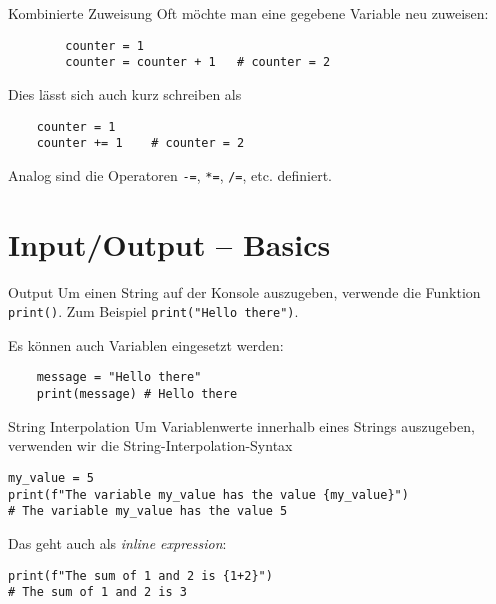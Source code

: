 \documentclass[algorithm,pgfplots,colortheme=dark]{cuzbeamer}
\newcommand{\py}[1]{\texttt{#1}}
\begin{document}
\begin{fragile}[]
	\begin{block}{Kombinierte Zuweisung}
		\vspace{2pt}
		Oft möchte man eine gegebene Variable neu zuweisen: 
		\begin{verbatim}
		counter = 1
		counter = counter + 1 	# counter = 2
		\end{verbatim}
	Dies lässt sich auch kurz schreiben als 
		\begin{verbatim}
	counter = 1
	counter += 1 	# counter = 2
	\end{verbatim}
	Analog sind die Operatoren \py{-=}, \py{*=}, \py{/=}, etc. definiert. 
	\end{block}
	
	
	\end{fragile}



\section{Input/Output -- Basics}

\begin{fragile}[]

\begin{block}{Output}
	\vspace{2pt}
	Um einen String auf der Konsole auszugeben, verwende die Funktion \py{print()}. 
	Zum Beispiel \py{print("Hello there")}. 
	
	Es können auch Variablen eingesetzt werden: 
	\begin{verbatim}
	message = "Hello there"
	print(message) # Hello there
	\end{verbatim}
	
	\end{block}
	
\end{fragile}

\begin{fragile}[]
	
\begin{block}{String Interpolation}
\vspace{2pt}
Um Variablenwerte innerhalb eines Strings auszugeben, verwenden wir die String-Interpolation-Syntax
\begin{verbatim}
my_value = 5
print(f"The variable my_value has the value {my_value}")
# The variable my_value has the value 5
\end{verbatim}

Das geht auch als \textit{inline expression}: 
\begin{verbatim}
print(f"The sum of 1 and 2 is {1+2}")
# The sum of 1 and 2 is 3
\end{verbatim}

\end{block}
	
\end{fragile}
\end{document}
